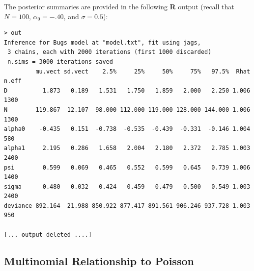 The posterior summaries are provided in the following {\bf R}
output (recall that
$N=100$, $\alpha_{0}= -.40$, and $\sigma=0.5$):
{\small
\begin{verbatim}
> out
Inference for Bugs model at "model.txt", fit using jags,
 3 chains, each with 2000 iterations (first 1000 discarded)
 n.sims = 3000 iterations saved
         mu.vect sd.vect    2.5%     25%     50%     75%   97.5%  Rhat n.eff
D          1.873   0.189   1.531   1.750   1.859   2.000   2.250 1.006  1300
N        119.867  12.107  98.000 112.000 119.000 128.000 144.000 1.006  1300
alpha0    -0.435   0.151  -0.738  -0.535  -0.439  -0.331  -0.146 1.004   580
alpha1     2.195   0.286   1.658   2.004   2.180   2.372   2.785 1.003  2400
psi        0.599   0.069   0.465   0.552   0.599   0.645   0.739 1.006  1400
sigma      0.480   0.032   0.424   0.459   0.479   0.500   0.549 1.003  2400
deviance 892.164  21.988 850.922 877.417 891.561 906.246 937.728 1.003   950

[... output deleted ....]
\end{verbatim}
}


\subsection{Multinomial Relationship to Poisson}

